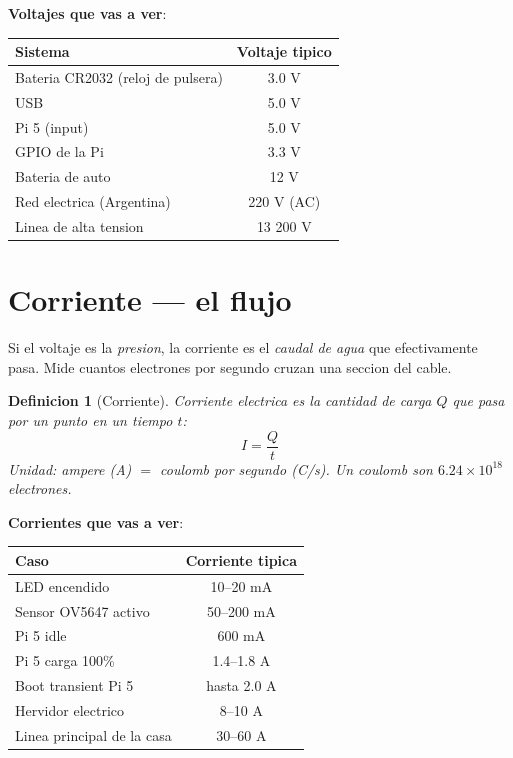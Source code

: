 \documentclass[11pt,a4paper,oneside,openright]{book}
\newtheorem{definicion}{Definicion}[chapter]
\begin{document}
\textbf{Voltajes que vas a ver}:

\begin{center}
\begin{tabular}{lc}
\toprule
\textbf{Sistema} & \textbf{Voltaje tipico} \\
\midrule
Bateria CR2032 (reloj de pulsera)   & 3.0 V \\
USB                                  & 5.0 V \\
Pi 5 (input)                         & 5.0 V \\
GPIO de la Pi                        & 3.3 V \\
Bateria de auto                      & 12 V \\
Red electrica (Argentina)            & 220 V (AC) \\
Linea de alta tension                & 13 200 V \\
\bottomrule
\end{tabular}
\end{center}

\section{Corriente --- el flujo}

\begin{intuibox}
Si el voltaje es la \emph{presion}, la corriente es el \emph{caudal de
agua} que efectivamente pasa. Mide cuantos electrones por segundo cruzan
una seccion del cable.
\end{intuibox}

\begin{definicion}[Corriente]
Corriente electrica es la cantidad de carga $Q$ que pasa por un punto en
un tiempo $t$:
\begin{equation}
I = \frac{Q}{t}
\end{equation}
Unidad: ampere (A) $=$ coulomb por segundo (C/s). Un coulomb son
$6.24 \times 10^{18}$ electrones.
\end{definicion}

\textbf{Corrientes que vas a ver}:

\begin{center}
\begin{tabular}{lc}
\toprule
\textbf{Caso} & \textbf{Corriente tipica} \\
\midrule
LED encendido                & 10--20 mA \\
Sensor OV5647 activo          & 50--200 mA \\
Pi 5 idle                     & 600 mA \\
Pi 5 carga 100\%              & 1.4--1.8 A \\
Boot transient Pi 5           & hasta 2.0 A \\
Hervidor electrico            & 8--10 A \\
Linea principal de la casa    & 30--60 A \\
\bottomrule
\end{tabular}
\end{center}
\end{document}
